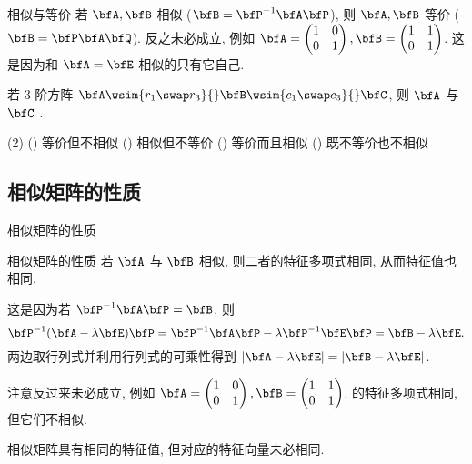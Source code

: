 \begin{frame}{相似与等价}
	\onslide<+->
	若 $\bfA,\bfB$ 相似 ($\bfB=\bfP^{-1}\bfA\bfP$), 则 $\bfA,\bfB$ 等价 ($\bfB=\bfP\bfA\bfQ$).
		反之未必成立, 例如 $\bfA=\begin{pmatrix}
			1&0\\
			0&1
		\end{pmatrix}, \bfB=\begin{pmatrix}
			1&1\\
			0&1
		\end{pmatrix}$.
		这是因为和 $\bfA=\bfE$ 相似的只有它自己.
	\onslide<+->
	\begin{example}
		若 $3$ 阶方阵 $\bfA\wsim{r_1\swap r_3}{}\bfB\wsim{c_1\swap c_3}{}\bfC$, 则 $\bfA$ 与 $\bfC$ .
		\begin{taskschoice}(2)
			() 等价但不相似
			() 相似但不等价
			() 等价而且相似
			() 既不等价也不相似
		\end{taskschoice}
	\end{example}
\end{frame}


\subsection{相似矩阵的性质}

\begin{frame}{相似矩阵的性质}
	\onslide<+->
	\begin{second}{相似矩阵的性质}
		若 $\bfA$ 与 $\bfB$ 相似, 则二者的特征多项式相同, 从而特征值也相同.
	\end{second}
	\onslide<+->
	这是因为若 $\bfP^{-1}\bfA\bfP=\bfB$, 则
	\[\bfP^{-1}(\bfA-\lambda\bfE)\bfP=\bfP^{-1}\bfA\bfP-\lambda\bfP^{-1}\bfE\bfP=\bfB-\lambda\bfE.\]
	\onslide<+->
	两边取行列式并利用行列式的可乘性得到 $|\bfA-\lambda\bfE|=|\bfB-\lambda\bfE|$.

	\onslide<+->
	注意反过来未必成立, 例如 $\bfA=\begin{pmatrix}
		1&0\\
		0&1
	\end{pmatrix}, \bfB=\begin{pmatrix}
		1&1\\
		0&1
	\end{pmatrix}$.
	的特征多项式相同, 但它们不相似.

	\onslide<+->
	相似矩阵具有相同的特征值, 但对应的特征向量未必相同.
\end{frame}



